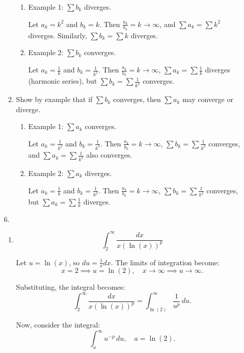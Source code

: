 \documentclass[12pt]{article}
\begin{document}
\begin{enumerate}
\begin{enumerate}
    \begin{enumerate}
        \item Example 1: $\sum b_k$ diverges.

        Let $a_k = k^2$ and $b_k = k$. Then $\frac{a_k}{b_k} = k \to \infty$, and $\sum a_k = \sum k^2$ diverges. Similarly, $\sum b_k = \sum k$ diverges.

        \item Example 2: $\sum b_k$ converges.

        Let $a_k = \frac{1}{k}$ and $b_k = \frac{1}{k^2}$. Then $\frac{a_k}{b_k} = k \to \infty$, $\sum a_k = \sum \frac{1}{k}$ diverges (harmonic series), but $\sum b_k = \sum \frac{1}{k^2}$ converges.
    \end{enumerate}

    \item Show by example that if $\sum b_k$ converges, then $\sum a_k$ may converge or diverge.

    \begin{enumerate}
        \item Example 1: $\sum a_k$ converges.

        Let $a_k = \frac{1}{k^2}$ and $b_k = \frac{1}{k^3}$. Then $\frac{a_k}{b_k} = k \to \infty$, $\sum b_k = \sum \frac{1}{k^3}$ converges, and $\sum a_k = \sum \frac{1}{k^2}$ also converges.

        \item Example 2: $\sum a_k$ diverges.

        Let $a_k = \frac{1}{k}$ and $b_k = \frac{1}{k^2}$. Then $\frac{a_k}{b_k} = k \to \infty$, $\sum b_k = \sum \frac{1}{k^2}$ converges, but $\sum a_k = \sum \frac{1}{k}$ diverges.
    \end{enumerate}
\end{enumerate}

\item [6.]
\begin{enumerate}
    \item 
    \[
\int_2^\infty \frac{dx}{x(\ln(x))^p}
\]

Let \( u = \ln(x) \), so \( du = \frac{1}{x}dx \). The limits of integration become:
\[
x = 2 \implies u = \ln(2), \quad x \to \infty \implies u \to \infty.
\]

Substituting, the integral becomes:
\[
\int_2^\infty \frac{dx}{x(\ln(x))^p} = \int_{\ln(2)}^\infty \frac{1}{u^p} \, du.
\]

Now, consider the integral:
\[
\int_a^\infty u^{-p} \, du, \quad a = \ln(2).
\]


\end{enumerate}
\end{enumerate}
\end{document}
